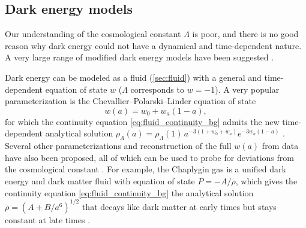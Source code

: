 \documentclass[USenglish, thumbmarks]{uiophdthesis} %
\begin{document}
\subsection{Dark energy models}
\label{sec:modify_de}

Our understanding of the cosmological constant $\Lambda$ is poor,
and there is no good reason why dark energy could not have a dynamical and time-dependent nature.
A very large range of modified dark energy models have been suggested \cite[e.g.][]{copelandDynamicsDarkEnergy2006}.

Dark energy can be modeled as a fluid (\cref{sec:fluid}) with a general and time-dependent equation of state $w$
($\Lambda$ corresponds to $w = -1$).
A very popular parameterization is the Chevallier--Polarski--Linder equation of state
\begin{equation}
    w(a) = w_0 + w_a (1-a),
\label{eq:w0wa}
\end{equation}
for which the continuity equation \eqref{eq:fluid_continuity_bg} admits the new time-dependent analytical solution
$\rho_\Lambda(a) = \rho_\Lambda(1) \, a^{-3(1+w_0+w_a)} e^{-3 w_a (1-a)}$
\cite{chevallierAcceleratingUniversesScaling2001,linderExploringExpansionHistory2003}.
Several other parameterizations and reconstruction of the full $w(a)$ from data have also been proposed,
all of which can be used to probe for deviations from the cosmological constant
\cite[e.g.][]{jassalWMAPConstraintsLow2005,sahniReconstructingDarkEnergy2006,seikelReconstructionDarkEnergy2012,hutererDarkEnergyTwo2018}.
For example, the Chaplygin gas
is a unified dark energy and dark matter fluid with equation of state $P=-A/\rho$,
which gives the continuity equation \eqref{eq:fluid_continuity_bg} the analytical solution $\rho = (A+B/a^6)^{1/2}$
that decays like dark matter at early times but stays constant at late times
\cite{kamenshchikAlternativeQuintessence2001}.
\end{document}
